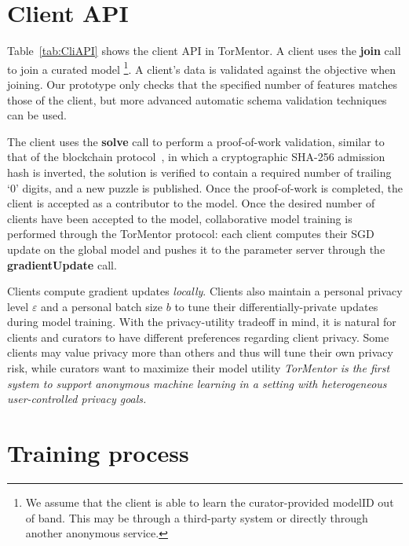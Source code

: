 \section{Client API} 

Table~\ref{tab:CliAPI} shows the client API in TorMentor. 
A client uses the \textbf{join} call to join a curated model
\footnote{We assume that the client is able to learn the
curator-provided modelID out of band. This may be through a
third-party system or directly through another anonymous service.}. A
client's data is validated against the objective when joining. Our
prototype only checks that the specified number of features matches
those of the client, but more advanced automatic schema validation
techniques~\cite{Rahm:2001} can be used.

The client uses the \textbf{solve} call to perform a proof-of-work
validation, similar to that of the blockchain 
protocol~\cite{Nakamoto:2009}, in which a cryptographic SHA-256
admission hash is inverted, the solution is verified to contain
a required number of trailing `0' digits, and a new puzzle is
published. Once the proof-of-work is completed, the client is accepted
as a contributor to the model. Once the desired number of clients have
been accepted to the model, collaborative model training is performed
through the TorMentor protocol: each client computes their SGD update
on the global model and pushes it to the parameter server through the 
\textbf{gradientUpdate} call.

Clients compute gradient updates \emph{locally}. Clients also
maintain a personal privacy level $\varepsilon$ and a personal batch
size $b$ to tune their differentially-private updates during model
training. With the privacy-utility tradeoff in mind, it is natural for
clients and curators to have different preferences regarding client
privacy. Some clients may value privacy more than others and thus will
tune their own privacy risk, while curators want to maximize their
model utility \emph{TorMentor is the first system to support anonymous
machine learning in a setting with heterogeneous user-controlled
privacy goals.}

\section{Training process}
\label{sec:training}


